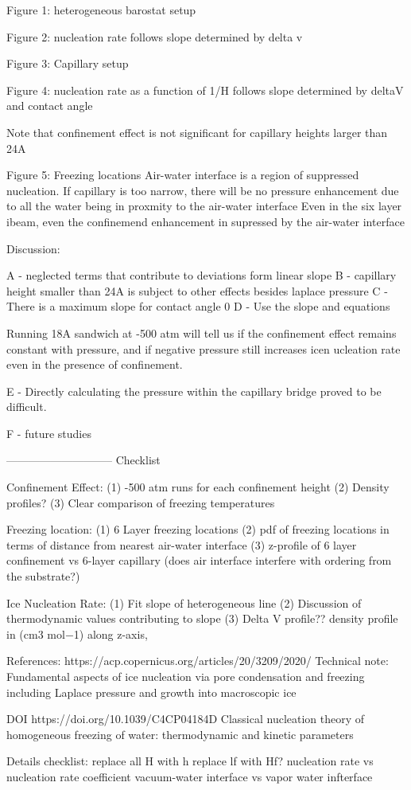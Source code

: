 

Figure 1:
heterogeneous barostat setup

Figure 2: 
nucleation rate follows slope determined by delta v

Figure 3:
Capillary setup

Figure 4: nucleation rate as a function of 1/H follows slope determined by deltaV and contact angle

Note that confinement effect is not significant for capillary heights larger than 24A

Figure 5: Freezing locations
Air-water interface is a region of suppressed nucleation. If capillary is too narrow, there will be no pressure enhancement due to all the water being in proxmity to the air-water interface
Even in the six layer ibeam, even the confinemend enhancement in supressed by the air-water interface



Discussion: 

A - neglected terms that contribute to deviations form linear slope
B - capillary height smaller than 24A is subject to other effects besides laplace pressure
C - There is a maximum slope for contact angle 0
D - Use the slope and equations

Running 18A sandwich at -500 atm will tell us if the confinement effect remains constant with pressure, and if negative pressure still increases icen ucleation rate even in the presence of confinement.


E - Directly calculating the pressure within the capillary bridge proved to be difficult. 

F - future studies 


-----------------------------
Checklist

Confinement Effect:
(1)  -500 atm runs for each confinement height
(2) Density profiles?
(3) Clear comparison of freezing temperatures

Freezing location:
(1) 6 Layer freezing locations
(2) pdf of freezing locations in terms of distance from nearest air-water interface
(3) z-profile of 6 layer confinement vs 6-layer capillary (does air interface interfere with ordering from the substrate?)

Ice Nucleation Rate:
(1) Fit slope of heterogeneous line
(2) Discussion of thermodynamic values contributing to slope
(3) Delta V profile?? density profile in (cm3 mol−1) along z-axis, 

References:
https://acp.copernicus.org/articles/20/3209/2020/
Technical note: Fundamental aspects of ice nucleation via pore condensation and freezing including Laplace pressure and growth into macroscopic ice


DOI
    https://doi.org/10.1039/C4CP04184D 
Classical nucleation theory of homogeneous freezing of water: thermodynamic and kinetic parameters 


Details checklist:
replace all H with h
replace lf with Hf?
nucleation rate vs nucleation rate coefficient
vacuum-water interface vs vapor water infterface

